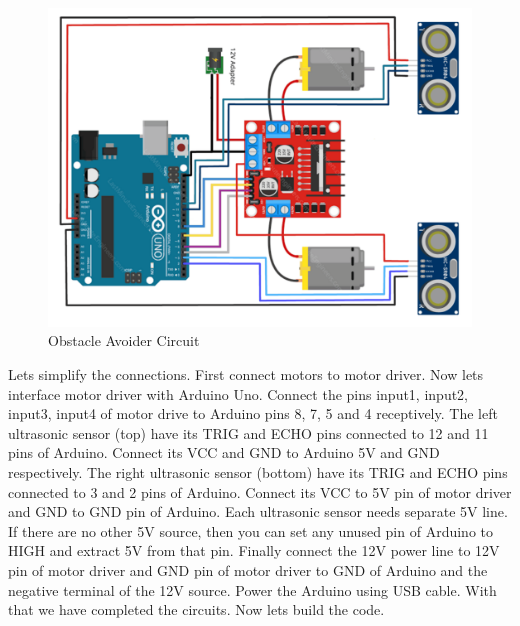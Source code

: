 \begin{figure}
    \centering
    \includegraphics{Chapters/images/ultraSonic_objAvoider_circuit.png}
     \caption{Obstacle Avoider Circuit}
\end{figure}
\vspace{1cm}
Lets simplify the connections. First connect motors to motor driver. Now lets interface motor driver with Arduino Uno. Connect the pins input1, input2, input3, input4 of motor drive to Arduino pins 8, 7, 5 and 4 receptively. The left ultrasonic sensor (top) have its TRIG and ECHO pins connected to 12 and 11 pins of Arduino. Connect its VCC and GND to Arduino 5V and GND respectively. The right ultrasonic sensor (bottom) have its TRIG and ECHO pins connected to 3 and 2 pins of Arduino. Connect its VCC to 5V pin of motor driver and GND to GND pin of Arduino. Each ultrasonic sensor needs separate 5V line. If there are no other 5V source, then you can set any unused pin of Arduino to HIGH and extract 5V from that pin. Finally connect the 12V power line to 12V pin of motor driver and GND pin of motor driver to GND of Arduino and the negative terminal of the 12V source. Power the Arduino using USB cable. With that we have completed the circuits. Now lets build the code.

